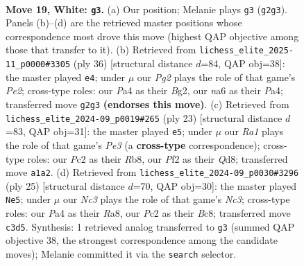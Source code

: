 \documentclass[11pt]{article}
\begin{document}
\clearpage

\begin{figure}[p]\centering
\begin{subfigure}{0.46\textwidth}\centering
\resizebox{\linewidth}{!}{%
\newchessgame
\chessboard[
  setfen={2b1r1k1/r3qpp1/np1p1n2/4p2p/P3P3/2NB1N2/2PQ1PPP/R1R3K1 w - - 2 19},
  showmover=false,
  pgfstyle=straightmove, color=movearrow, markmove={g2-g3}
]}
\caption{}
\end{subfigure}\hfill
\begin{subfigure}{0.46\textwidth}\centering
\resizebox{\linewidth}{!}{%
\newchessgame
\chessboard[
  setfen={r1b2rk1/pp2qpp1/1n3n1p/4p3/P1P5/2NQ1NP1/4PPBP/R4RK1 w - - 4 19},
  showmover=false,
  pgfstyle=straightmove, color=movearrow, markmove={e2-e4}
]}
\caption{}
\end{subfigure}
\\[4pt]
\begin{subfigure}{0.46\textwidth}\centering
\resizebox{\linewidth}{!}{%
\newchessgame
\chessboard[
  setfen={1rbq1rk1/1p3ppp/p1nppn2/8/3PP3/N1PB1N2/4QPPP/R3K2R b KQ - 3 12},
  showmover=false,
  pgfstyle=straightmove, color=movearrow, markmove={e6-e5}
]}
\caption{}
\end{subfigure}\hfill
\begin{subfigure}{0.46\textwidth}\centering
\resizebox{\linewidth}{!}{%
\newchessgame
\chessboard[
  setfen={r1b2rk1/1pp1qppp/p1np1n2/8/4P3/2NBPN1P/PPP3P1/R2Q1RK1 b - - 0 13},
  showmover=false,
  pgfstyle=straightmove, color=movearrow, markmove={c6-e5}
]}
\caption{}
\end{subfigure}
\caption{\textbf{Move 19, White: \texttt{g3}.} (a) Our position; Melanie plays \texttt{g3} (\texttt{g2g3}). Panels (b)--(d) are the retrieved master positions whose correspondence most drove this move (highest QAP objective among those that transfer to it). (b) Retrieved from \texttt{lichess\_elite\_2025-11\_p0000\#3305} (ply 36) [structural distance $d$=84, QAP obj=38]: the master played \texttt{e4}; under $\mu$ our \emph{Pg2} plays the role of that game's \emph{Pe2}; cross-type roles: our \emph{P}a4 as their \emph{B}g2, our \emph{n}a6 as their \emph{P}a4; transferred move \texttt{g2g3} \textbf{(endorses this move)}. (c) Retrieved from \texttt{lichess\_elite\_2024-09\_p0019\#265} (ply 23) [structural distance $d$=83, QAP obj=31]: the master played \texttt{e5}; under $\mu$ our \emph{Ra1} plays the role of that game's \emph{Pe3} (a \textbf{cross-type} correspondence); cross-type roles: our \emph{P}c2 as their \emph{R}b8, our \emph{P}f2 as their \emph{Q}d8; transferred move \texttt{a1a2}. (d) Retrieved from \texttt{lichess\_elite\_2024-09\_p0030\#3296} (ply 25) [structural distance $d$=70, QAP obj=30]: the master played \texttt{Ne5}; under $\mu$ our \emph{Nc3} plays the role of that game's \emph{Nc3}; cross-type roles: our \emph{P}a4 as their \emph{R}a8, our \emph{P}c2 as their \emph{B}c8; transferred move \texttt{c3d5}. Synthesis: 1 retrieved analog transferred to \texttt{g3} (summed QAP objective 38, the strongest correspondence among the candidate moves); Melanie committed it via the \texttt{search} selector.}
\label{fig:thought-m36}
\end{figure}
\end{document}
